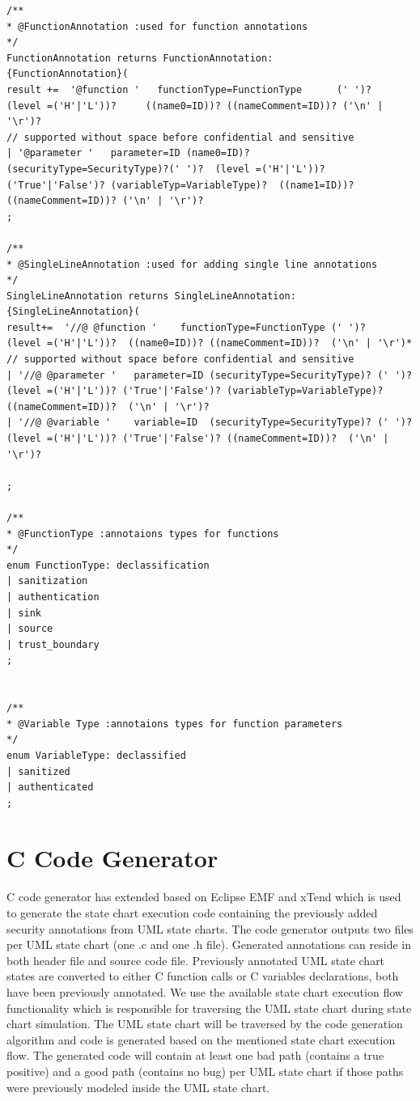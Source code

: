 \begin{lstlisting}
/**
* @FunctionAnnotation :used for function annotations
*/ 
FunctionAnnotation returns FunctionAnnotation:
{FunctionAnnotation}( 
result +=  '@function '   functionType=FunctionType      (' ')?                              (level =('H'|'L'))?     ((name0=ID))? ((nameComment=ID))? ('\n' | '\r')?
// supported without space before confidential and sensitive
| '@parameter '   parameter=ID (name0=ID)? (securityType=SecurityType)?(' ')?  (level =('H'|'L'))? ('True'|'False')? (variableTyp=VariableType)?  ((name1=ID))? ((nameComment=ID))? ('\n' | '\r')?	
;

/**
* @SingleLineAnnotation :used for adding single line annotations
*/ 
SingleLineAnnotation returns SingleLineAnnotation:
{SingleLineAnnotation}(
result+=  '//@ @function '    functionType=FunctionType (' ')?                  (level =('H'|'L'))?  ((name0=ID))? ((nameComment=ID))?  ('\n' | '\r')*
// supported without space before confidential and sensitive
| '//@ @parameter '   parameter=ID (securityType=SecurityType)? (' ')?  (level =('H'|'L'))? ('True'|'False')? (variableTyp=VariableType)?  ((nameComment=ID))?  ('\n' | '\r')?
| '//@ @variable '    variable=ID  (securityType=SecurityType)? (' ')?  (level =('H'|'L'))? ('True'|'False')? ((nameComment=ID))?  ('\n' | '\r')?

;

/**
* @FunctionType :annotaions types for functions
*/ 
enum FunctionType: declassification 
| sanitization
| authentication
| sink
| source
| trust_boundary
;


/**
* @Variable Type :annotaions types for function parameters
*/ 
enum VariableType: declassified 
| sanitized
| authenticated
;	
\end{lstlisting}

\section{C Code Generator}
C code generator has extended based on Eclipse EMF and xTend which is used to generate the state chart execution code containing the previously added security annotations from UML state charts. The code generator outputs two files per UML state chart (one .c and one
.h file). Generated annotations can reside in both header file
and source code file. Previously annotated UML state chart
states are converted to either C function calls or C variables
declarations, both have been previously annotated. We use
the available state chart execution flow functionality which is
responsible for traversing the UML state chart during state
chart simulation. The UML state chart will be traversed by the code generation algorithm and code is generated based on
the mentioned state chart execution flow. The generated code
will contain at least one bad path (contains a true positive) and
a good path (contains no bug) per UML state chart if those
paths were previously modeled inside the UML state chart.\\

